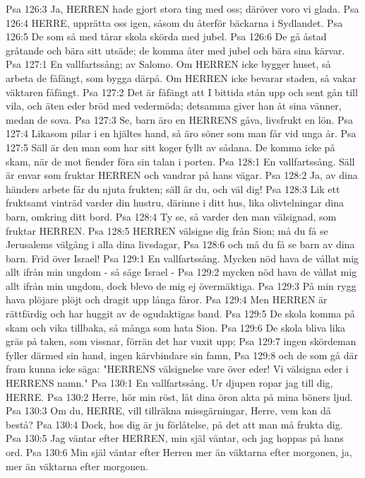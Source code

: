 Psa 126:3  Ja, HERREN hade gjort stora ting med oss; däröver voro vi glada.
Psa 126:4  HERRE, upprätta oss igen, såsom du återför bäckarna i Sydlandet.
Psa 126:5  De som så med tårar skola skörda med jubel.
Psa 126:6  De gå åstad gråtande och bära sitt utsäde; de komma åter med jubel och bära sina kärvar.
Psa 127:1  En vallfartssång; av Salomo. Om HERREN icke bygger huset, så arbeta de fåfängt, som bygga därpå. Om HERREN icke bevarar staden, så vakar väktaren fåfängt.
Psa 127:2  Det är fåfängt att I bittida stån upp och sent gån till vila, och äten eder bröd med vedermöda; detsamma giver han åt sina vänner, medan de sova.
Psa 127:3  Se, barn äro en HERRENS gåva, livsfrukt en lön.
Psa 127:4  Likasom pilar i en hjältes hand, så äro söner som man får vid unga år.
Psa 127:5  Säll är den man som har sitt koger fyllt av sådana. De komma icke på skam, när de mot fiender föra sin talan i porten.
Psa 128:1  En vallfartssång. Säll är envar som fruktar HERREN och vandrar på hans vägar.
Psa 128:2  Ja, av dina händers arbete får du njuta frukten; säll är du, och väl dig!
Psa 128:3  Lik ett fruktsamt vinträd varder din hustru, därinne i ditt hus, lika olivtelningar dina barn, omkring ditt bord.
Psa 128:4  Ty se, så varder den man välsignad, som fruktar HERREN.
Psa 128:5  HERREN välsigne dig från Sion; må du få se Jerusalems välgång i alla dina livsdagar,
Psa 128:6  och må du få se barn av dina barn. Frid över Israel!
Psa 129:1  En vallfartssång. Mycken nöd hava de vållat mig allt ifrån min ungdom - så säge Israel -
Psa 129:2  mycken nöd hava de vållat mig allt ifrån min ungdom, dock blevo de mig ej övermäktiga.
Psa 129:3  På min rygg hava plöjare plöjt och dragit upp långa fåror.
Psa 129:4  Men HERREN är rättfärdig och har huggit av de ogudaktigas band.
Psa 129:5  De skola komma på skam och vika tillbaka, så många som hata Sion.
Psa 129:6  De skola bliva lika gräs på taken, som vissnar, förrän det har vuxit upp;
Psa 129:7  ingen skördeman fyller därmed sin hand, ingen kärvbindare sin famn,
Psa 129:8  och de som gå där fram kunna icke säga: "HERRENS välsignelse vare över eder! Vi välsigna eder i HERRENS namn."
Psa 130:1  En vallfartssång. Ur djupen ropar jag till dig, HERRE.
Psa 130:2  Herre, hör min röst, låt dina öron akta på mina böners ljud.
Psa 130:3  Om du, HERRE, vill tillräkna missgärningar, Herre, vem kan då bestå?
Psa 130:4  Dock, hos dig är ju förlåtelse, på det att man må frukta dig.
Psa 130:5  Jag väntar efter HERREN, min själ väntar, och jag hoppas på hans ord.
Psa 130:6  Min själ väntar efter Herren mer än väktarna efter morgonen, ja, mer än väktarna efter morgonen.
